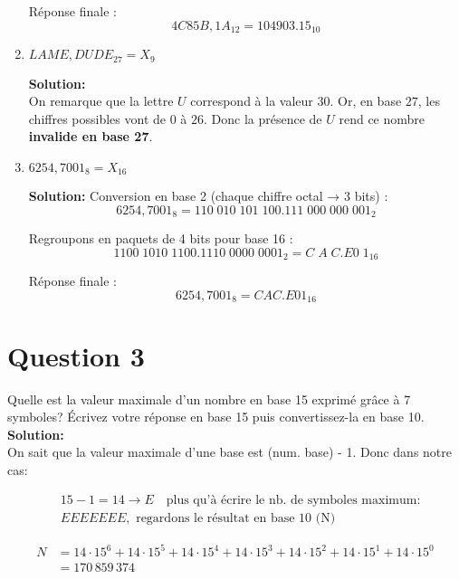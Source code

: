 \documentclass{article}
\begin{document}
\begin{enumerate}[label=\alph*), itemsep=2em]
    Réponse finale :
    \[
    4C85B,1A_{12} = 104903.15_{10}
    \]

    \item $LAME,DUDE_{27} = X_{9}$

    \textbf{Solution:} \\
    On remarque que la lettre $U$ correspond à la valeur $30$.  
    Or, en base $27$, les chiffres possibles vont de $0$ à $26$.  
    Donc la présence de $U$ rend ce nombre \textbf{invalide en base 27}.  

    \item $6254,7001_{8} = X_{16}$

    \textbf{Solution:}  
    Conversion en base 2 (chaque chiffre octal → 3 bits) :
    \[
    6254,7001_{8} = 110\;010\;101\;100.111\;000\;000\;001_{2}
    \]

    Regroupons en paquets de 4 bits pour base 16 :
    \[
    1100\;1010\;1100.1110\;0000\;0001_{2} = C\;A\;C.E0\;1_{16}
    \]

    Réponse finale :
    \[
    6254,7001_{8} = CAC.E01_{16}
    \]
\end{enumerate}

\newpage

\section*{Question 3}
Quelle est la valeur maximale d'un nombre en base 15 exprimé grâce à 7 symboles?
Écrivez votre réponse en base 15 puis convertissez-la en base 10. \\[4pt]

\textbf{Solution:} \\[4pt]
On sait que la valeur maximale d'une base est (num. base) - 1. Donc dans notre cas:

\begin{flushleft}
\[
\begin{aligned}
&15 - 1 = 14 \rightarrow E \quad \text{plus qu'à écrire le nb. de symboles maximum:} \\
& EEEEEEE\text{,} \,\,\, \text{regardons le résultat en base 10 (N)}
\end{aligned}
\]
\end{flushleft}

\[
\begin{aligned}
N &= 14 \cdot 15^6 + 14 \cdot 15^5 + 14 \cdot 15^4 + 14 \cdot 15^3 + 14 \cdot 15^2 + 14 \cdot 15^1 + 14 \cdot 15^0 \\
&= 170\,859\,374
\end{aligned}
\]
\end{document}

